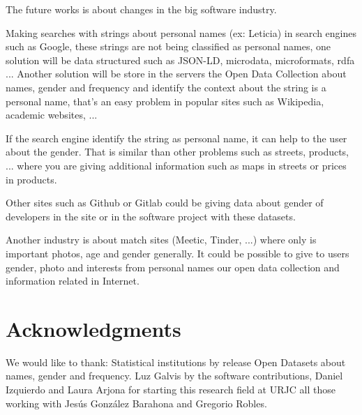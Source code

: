 \documentclass[a4paper]{article}
\begin{document}
The future works is about changes in the big software industry.

Making searches with strings about personal names (ex: Leticia) in
search engines such as Google, these strings are not being classified
as personal names, one solution will be data structured such as
JSON-LD, microdata, microformats, rdfa ... Another solution will be
store in the servers the Open Data Collection about names, gender and
frequency and identify the context about the string is a personal
name, that's an easy problem in popular sites such as Wikipedia,
academic websites, ...

If the search engine identify the string as personal name, it can help
to the user about the gender. That is similar than other problems such
as streets, products, ... where you are giving additional information
such as maps in streets or prices in products.

Other sites such as Github or Gitlab could be giving data about
gender of developers in the site or in the software project with these
datasets.

Another industry is about match sites (Meetic, Tinder, ...) where only
is important photos, age and gender generally. It could be possible to give
to users gender, photo and interests from personal names our open data
collection and information related in Internet.


\section*{Acknowledgments}

We would like to thank: Statistical institutions by release Open
Datasets about names, gender and frequency. Luz Galvis by the
software contributions, Daniel Izquierdo and Laura Arjona for
starting this research field at URJC all those working with Jesús
González Barahona and Gregorio Robles. 



\end{document}

